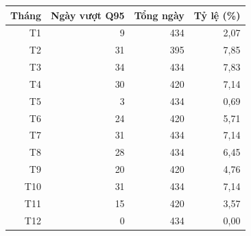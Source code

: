 \begin{tabular}{rrrr}
\toprule
Tháng & Ngày vượt Q95 & Tổng ngày & Tỷ lệ (\%) \\
\midrule
T1 & 9 & 434 & 2{,}07 \\
T2 & 31 & 395 & 7{,}85 \\
T3 & 34 & 434 & 7{,}83 \\
T4 & 30 & 420 & 7{,}14 \\
T5 & 3 & 434 & 0{,}69 \\
T6 & 24 & 420 & 5{,}71 \\
T7 & 31 & 434 & 7{,}14 \\
T8 & 28 & 434 & 6{,}45 \\
T9 & 20 & 420 & 4{,}76 \\
T10 & 31 & 434 & 7{,}14 \\
T11 & 15 & 420 & 3{,}57 \\
T12 & 0 & 434 & 0{,}00 \\
\bottomrule
\end{tabular}
